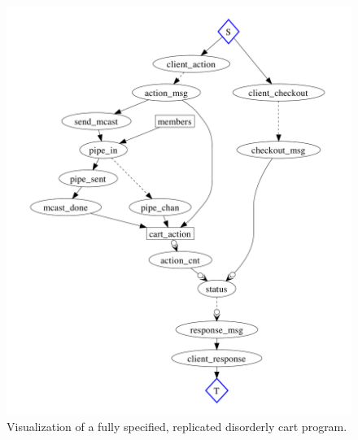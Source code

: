 \begin{figure}[t]
\centering
\includegraphics[width=1\linewidth]{fig/disorderly_complete.pdf}
\vspace{-10pt}
\caption{Visualization of a fully specified, replicated disorderly cart program.}
\label{fig:pdg-disorderly-analysis}
\vspace{-2pt}
\end{figure}



